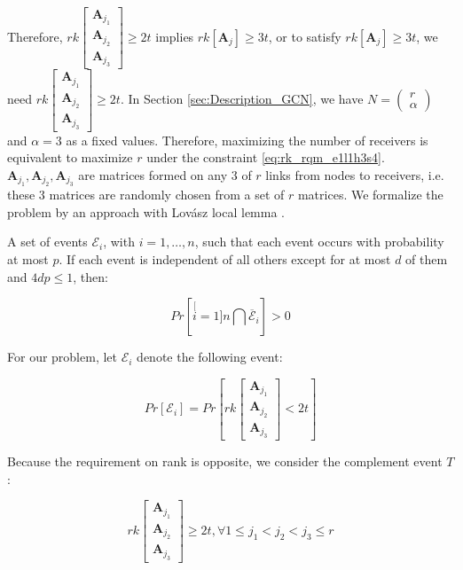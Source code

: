 Therefore, $rk\left[\begin{array}{c}
\boldsymbol{A}_{j_{1}}\\
\boldsymbol{A}_{j_{2}}\\
\boldsymbol{A}_{j_{3}}
\end{array}\right]\geq2t$ implies $rk\left[\boldsymbol{A}_{j}\right]\geq3t$, or to satisfy
$rk\left[\boldsymbol{A}_{j}\right]\geq3t$, we need $rk\left[\begin{array}{c}
\boldsymbol{A}_{j_{1}}\\
\boldsymbol{A}_{j_{2}}\\
\boldsymbol{A}_{j_{3}}
\end{array}\right]\geq2t$. In Section \ref{sec:Description_GCN}, we have $N=\left(\begin{array}{c}
r\\
\alpha
\end{array}\right)$ and $\alpha=3$ as a fixed values. Therefore, maximizing the number
of receivers is equivalent to maximize $r$ under the constraint \ref{eq:rk_rqm_e1l1h3s4}.
$\boldsymbol{A}_{j_{1}},\boldsymbol{A}_{j_{2}},\boldsymbol{A}_{j_{3}}$
are matrices formed on any 3 of $r$ links from nodes to receivers,
i.e. these 3 matrices are randomly chosen from a set of $r$ matrices.
We formalize the problem by an approach with Lovász local lemma \cite{MosheSchwartz:2018}.
\begin{thm}
\label{thm:LLL} \cite{Schwarz:2013}

A set of events $\mathcal{E}_{i}$, with $i=1,\ldots,n$, such that
each event occurs with probability at most $p$. If each event is
independent of all others except for at most $d$ of them and $4dp\leq1$,
then:

\[
Pr\left[\stackrel[i=1]{n}{\bigcap}\overline{\mathcal{E}}_{i}\right]>0
\]
\end{thm}
For our problem, let $\mathcal{E}_{i}$ denote the following event:

\[
Pr\left[\mathcal{E}_{i}\right]=Pr\left[rk\left[\begin{array}{c}
\boldsymbol{A}_{j_{1}}\\
\boldsymbol{A}_{j_{2}}\\
\boldsymbol{A}_{j_{3}}
\end{array}\right]<2t\right]
\]

Because the requirement on rank is opposite, we consider the complement
event $T$:

\[
rk\left[\begin{array}{c}
\boldsymbol{A}_{j_{1}}\\
\boldsymbol{A}_{j_{2}}\\
\boldsymbol{A}_{j_{3}}
\end{array}\right]\geq2t,\forall1\leq j_{1}<j_{2}<j_{3}\leq r
\]


